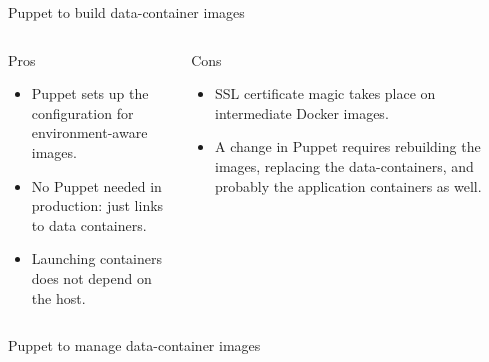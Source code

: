 \documentclass[presentation,c]{beamer}
\begin{document}
{
\begin{frame}[label=sec-13-5]{Puppet to build data-container images}

\begin{columns}
\begin{column}{0.5\textwidth}
\begin{block}{Pros}

\begin{itemize}
\item Puppet sets up the configuration for environment-aware images.
\item No Puppet needed in production: just links to data containers.
\item Launching containers does not depend on the host.
\end{itemize}
\end{block}
\end{column}

\begin{column}{0.5\textwidth}
\begin{block}{Cons}

\begin{itemize}
\item SSL certificate magic takes place on intermediate Docker images.
\item A change in Puppet requires rebuilding the images, replacing the data-containers, and probably the application containers as well.
\end{itemize}
\end{block}
\end{column}
\end{columns}
\end{frame}
} %

{
\begin{frame}[label=sec-13-6]{Puppet to manage data-container images}

\end{frame}
} %
\end{document}
